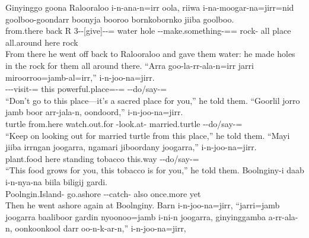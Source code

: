 \begin{exye}
\gll Ginyinggo goona Ralooraloo i-n-ana-n=irr oola, riiwa i-na-moogar-na=jirr=nid goolboo-goondarr boonyja booroo bornkobornko jiiba goolboo.\\
from.there back R 3--[give]--= water hole --make.something-== rock- all place all.around here rock\\
\ft From there he went off back to Ralooraloo and gave them water: he made holes in the rock for them all around there.
\exy {}
\gll ``Arra goo-la-rr-ala-n=irr jarri miroorroo=jamb-al=irr,'' i-n-joo-na=jirr.\\
 ---visit-= this powerful.place=-= --do/say-=\\
\ft ``Don't go to this place---it's a sacred place for you,'' he told them.
\exy {}
\gll ``Goorlil jorro jamb boor arr-jala-n, oondoord,'' i-n-joo-na=jirr.\\
turtle from.here  watch.out.for -look.at- married.turtle --do/say-=\\
\ft ``Keep on looking out for married turtle from this place,'' he told them.
\exy {}\enlargethispage*{1cm}
\gll ``Mayi jiiba irrngan joogarra, ngamari jiboordany joogarra,'' i-n-joo-na=jirr.\\
plant.food here standing   tobacco this.way  --do/say-=\\
\ft ``This food grows for you, this tobacco is for you,'' he told them.
\newpage\exy {}
\gll Boolnginy-i daab i-n-nya-na biila biligij gardi.\\
Poolngin.Island- go.ashore --catch- also once.more yet\\
\ft Then he went ashore again at Boolnginy.
\exy {}
\gll Barn i-n-joo-na=jirr, ``jarri=jamb joogarra baaliboor gardin nyoonoo=jamb i-ni-n joogarra, ginyinggamba a-rr-ala-n, oonkoonkool darr oo-n-k-ar-n,'' i-n-joo-na=jirr,\\

\end{exye}

